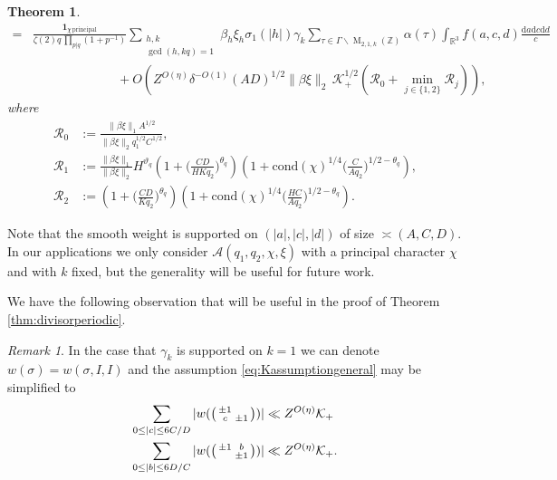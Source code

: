 \documentclass[12pt]{amsart}
\newtheorem{theorem}{Theorem}[section]
\theoremstyle{definition}
\theoremstyle{remark}
\newtheorem{remark}{Remark}
\numberwithin{equation}{section}
\newcommand{\R}{{\mathbb R}}
\newcommand{\Z}{{\mathbb Z}}
\newcommand{\1}{{\mathbf 1}}
\newcommand{\MM}{\operatorname{M}}
\renewcommand{\d}{\mathrm d}
\begin{document}
\begin{theorem}
\begin{align*}
   =&   \frac{\mathbf{1}_{\chi \, \mathrm{principal}}}{ \zeta(2)
 q\, \prod_{p|q}(1+p^{-1}) }\sum_{\substack{h,k \\ \gcd(h,kq)=1}} \beta_h \xi_h \sigma_1(|h|) \gamma_k \sum_{\tau \in \Gamma \backslash \MM_{2,1,k}(\Z)} \alpha(\tau)  \int_{\R^3} f(a,c,d) \frac{\d  a \d c \d d }{c}  \\
 &\hspace{80pt}+ O \left( Z^{O(\eta)} \delta^{-O(1)} (AD)^{1/2}  \|\beta \xi \|_2  \,  \mathcal{K}_+^{1/2} \left(\mathcal{R}_0 + \min_{j\in \{1,2\}}\mathcal{R}_j \right) \right),
\end{align*}
where 
\begin{align*}
    \mathcal{R}_0 &:= \frac{ \|\beta \xi \|_1  A^{1/2} }{\|\beta \xi \|_2  q_1^{1/2} C^{1/2}},  \\
    \mathcal{R}_1 &:=\frac{\|\beta  \xi \|_1}{\|\beta \xi \|_2} H^{\vartheta_q}  \left(1+\bigg(\frac{CD}{HK q_2 }\bigg)^{\theta_q} \right)\left(1+ \mathrm{cond}(\chi)^{1/4}\bigg(\frac{C}{A q_2}\bigg)^{1/2-\theta_q}\right) ,    \\
    \mathcal{R}_2 &:=\left(1+\bigg(\frac{ CD}{Kq_2}\bigg)^{\theta_q} \right)\left(1+ \mathrm{cond}(\chi)^{1/4}\bigg(\frac{H C}{A q_2 }\bigg)^{1/2-\theta_q}\right).
\end{align*}
\end{theorem}
Note that the smooth weight is supported on $(|a|,|c|,|d|)$ of size $\asymp (A,C,D)$. In our applications we only consider $\mathcal{A}(q_1,q_2,\chi,\xi)$ with a principal character $\chi$ and with $k$ fixed, but the generality will be useful for future work.

We have the following observation that will be useful in the proof of Theorem \ref{thm:divisorperiodic}.
\begin{remark}\label{rem:k=1blackbox}
In the case that $\gamma_k$ is supported on $k=1$ we can denote $w(\sigma) = w(\sigma,I,I)$ and the assumption 
\eqref{eq:Kassumptiongeneral} may be simplified to \begin{align}\label{eq:thmtwisteddetwbound1}
\begin{split}
     \sum_{0\leq |c| \leq 6 C/D} |w(\smqty(\pm 1 &  \\ c & \pm 1))| &\ll Z^{O(\eta)} \mathcal{K}_+ \\
   \sum_{0\leq|b| \leq 6 D/C} |w(\smqty(\pm 1 & b \\  & \pm 1))| &\ll Z^{O(\eta)} \mathcal{K}_+ .
   \end{split}
\end{align}
\end{remark}
\end{document}

